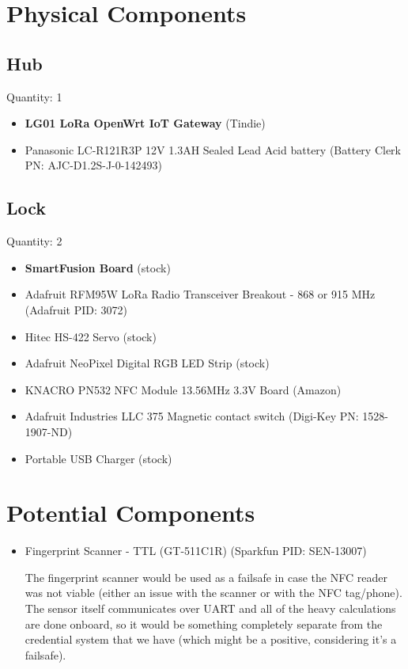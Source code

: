 \documentclass{article}
\begin{document}
\section{Physical Components}


\subsection{Hub}

\noindent
Quantity: 1

\noindent
\begin{itemize}
\item \textbf{LG01 LoRa OpenWrt IoT Gateway} (Tindie)
  \item Panasonic LC-R121R3P 12V 1.3AH Sealed Lead Acid battery (Battery Clerk
    PN: AJC-D1.2S-J-0-142493)
    \end{itemize}


\subsection{Lock}

\noindent
Quantity: 2

\begin{itemize}
  \item \textbf{SmartFusion Board} (stock)
  \item Adafruit RFM95W LoRa Radio Transceiver Breakout - 868 or 915 MHz
    (Adafruit PID: 3072)
  \item Hitec HS-422 Servo (stock)
  \item Adafruit NeoPixel Digital RGB LED Strip (stock)
  \item KNACRO PN532 NFC Module 13.56MHz 3.3V Board (Amazon)
  \item Adafruit Industries LLC 375 Magnetic contact switch (Digi-Key PN: 1528-1907-ND)
  \item Portable USB Charger (stock)
\end{itemize}

\section{Potential Components}

\begin{itemize}
\item Fingerprint Scanner - TTL (GT-511C1R) (Sparkfun PID: SEN-13007)

The fingerprint scanner would be used as a failsafe in case the NFC reader was
not viable (either an issue with the scanner or with the NFC tag/phone). The
sensor itself communicates over UART and all of the heavy calculations are done
onboard, so it would be something completely separate from the credential
system that we have (which might be a positive, considering it's a failsafe).

\end{itemize}
\end{document}
